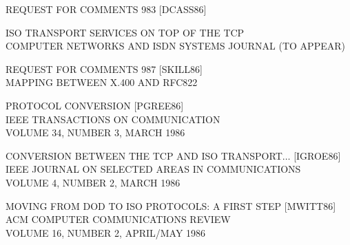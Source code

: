 \begin{bwslide}

\begin{nrtc}
\item	REQUEST FOR COMMENTS 983 [DCASS86]

\item	ISO TRANSPORT SERVICES ON TOP OF THE TCP\\
	COMPUTER NETWORKS AND ISDN SYSTEMS JOURNAL (TO APPEAR)

\item	REQUEST FOR COMMENTS 987 [SKILL86]\\
	MAPPING BETWEEN X.400 AND RFC822

\item	PROTOCOL CONVERSION [PGREE86]\\
	IEEE TRANSACTIONS ON COMMUNICATION\\
	VOLUME 34, NUMBER 3, MARCH 1986

\item	CONVERSION BETWEEN THE TCP AND ISO TRANSPORT$\ldots$
	[IGROE86]\\
	IEEE JOURNAL ON SELECTED AREAS IN COMMUNICATIONS\\
	VOLUME 4, NUMBER 2, MARCH 1986

\item	MOVING FROM DOD TO ISO PROTOCOLS: A FIRST STEP [MWITT86]\\
	ACM COMPUTER COMMUNICATIONS REVIEW\\
	VOLUME 16, NUMBER 2, APRIL/MAY 1986
\end{nrtc}
\end{bwslide}



